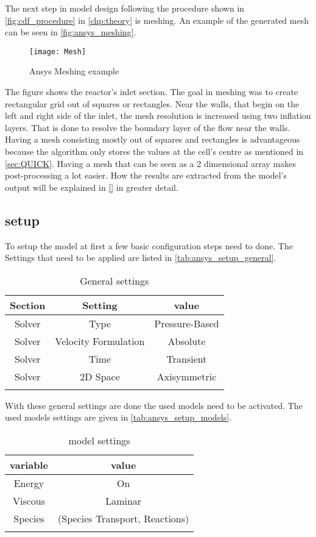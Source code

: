 \documentclass[../thesis.tex]{subfiles}
\begin{document}
The next step in model design following the procedure shown in \autoref{fig:cdf_procedure} in \autoref{chp:theory} is meshing. An example of the generated mesh can be seen in \autoref{fig:ansys_meshing}.
\begin{figure}[htb]
	\centering
	\texttt{[image: Mesh]}
	\caption{Ansys Meshing example}
	\label{fig:ansys_meshing}
\end{figure}
The figure shows the reactor's inlet section. The goal in meshing was to create rectangular grid out of squares or rectangles. Near the walls, that begin on the left and right side of the inlet, the mesh resolution is increased using two inflation layers. That is done to resolve the boundary layer of the flow near the walls. Having a mesh consisting mostly out of squares and rectangles is advantageous because the algorithm only stores the values at the cell's centre as mentioned in \autoref{sec:QUICK}. Having a mesh that can be seen as a 2 dimensional array makes post-processing a lot easier. How the results are extracted from the model's output will be explained in \autoref{} in greater detail.

\subsection{setup}

To setup the model at first a few basic configuration steps need to done. The Settings that need to be applied are listed in \autoref{tab:ansys_setup_general}.

\begin{table} [htb]
	\centering
	\caption{General settings}
	\begin{tabular}{ ccc }
		\hline
		Section & Setting & value \\
		\hline
		Solver & Type & Pressure-Based \\
		Solver & Velocity Formulation & Absolute  \\
		Solver & Time &  Transient  \\
		Solver & 2D Space & Axisymmetric \\
		\hline
		\label{tab:ansys_setup_general}
	\end{tabular}
\end{table}
With these general settings are done the used models need to be activated. The used models settings are given in \autoref{tab:ansys_setup_models}.

\begin{table} [htb]
	\centering
	\caption{model settings}
	\begin{tabular}{ cc }
		\hline
		variable & value \\
		\hline
		Energy & On \\
		Viscous & Laminar \\
		Species & (Species Transport, Reactions)  \\
		\hline
		\label{tab:ansys_setup_models}
	\end{tabular}
\end{table}
\end{document}
